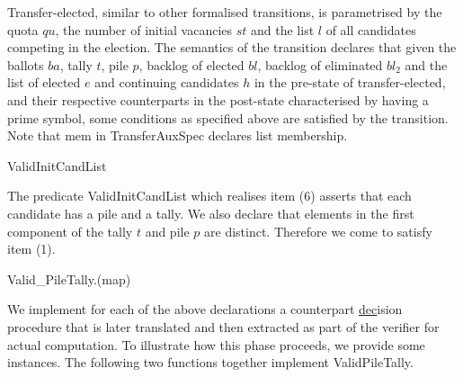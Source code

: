 \documentclass[10pt,conference]{IEEEtran}
\renewcommand{\HOLConst}[1]{{\textsf{\upshape #1}}}
\renewcommand{\HOLSymConst}[1]{\HOLConst{#1}}
\begin{document}
Transfer-elected, 
 similar to other formalised transitions, is parametrised by the quota $qu$, the number of initial vacancies $st$ and the list $l$ of all candidates competing in the election. The semantics of the transition declares that given the ballots $ba$, tally $t$, pile $p$, backlog of elected $bl$, backlog of eliminated $bl_{2}$ and the list of elected $e$ and continuing candidates $h$ in the pre-state of transfer-elected, and their respective counterparts in the post-state characterised by having a prime symbol, some conditions as specified above are satisfied by the transition.  Note that \textsf{mem} in TransferAuxSpec declares list membership. 
  
   
  
\begin{small}
\begin{holthmenv}
  \HOLConst{ValidInitCandList}\;\;\HOLSymConst{\HOLTokenEquiv{}}\;\;\HOLSymConst{\HOLTokenNotEqual{}}\;\HOLConst{\ensuremath{[\,]}}\;\HOLSymConst{\HOLTokenConj{}}\;\HOLConst{distinct}\;
\end{holthmenv}
\end{small}
The predicate ValidInitCandList which realises item (6) asserts that each candidate has a pile and a tally. We also declare that elements in the first component of the tally $t$ and pile $p$ are distinct. Therefore we come to satisfy item (1).
\begin{small}
\begin{holthmenv}
  \HOLConst{Valid_PileTally}\;\;\;\HOLSymConst{\HOLTokenEquiv{}}\;\HOLSymConst{\HOLTokenForall{}}.\;\HOLConst{\HOLConst{mem}}\;\;\;\HOLSymConst{\HOLTokenEquiv{}}\;\HOLConst{\HOLConst{mem}}\;\;(\HOLConst{map}\;\HOLConst{fst}\;)
\end{holthmenv}
\end{small}
We implement for each of the above declarations a counterpart 
\underline{dec}ision procedure that is later translated and then extracted as part of the verifier for actual computation. To illustrate how this phase proceeds, we provide some instances. The following two functions together implement Valid\textunderscore{}PileTally.
\end{document}
